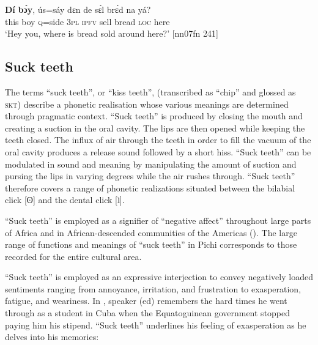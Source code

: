 \ea%
    \label{ex:key:1662}
    \gll \textbf{Dí}  \textbf{bɔ́y}, ús=sáy  dɛn  de  sɛ́l  brɛ́d    na  yá?\\
this  boy  \textsc{q=}side  \textsc{3pl}  \textsc{ipfv}  sell  bread  \textsc{loc}  here\\

\glt ‘Hey you, where is bread sold around here?’ [nn07fn 241]
\z

\subsection{Suck teeth}\label{sec:12.2.4}

The terms “suck teeth”, or “kiss teeth”, (transcribed as “chip” and glossed as \textsc{skt}) describe a phonetic realisation whose various meanings are determined through pragmatic context. “Suck teeth” is produced by closing the mouth and creating a suction in the oral cavity. The lips are then opened while keeping the teeth closed. The influx of air through the teeth in order to fill the vacuum of the oral cavity produces a release sound followed by a short hiss. “Suck teeth” can be modulated in sound and meaning by manipulating the amount of suction and pursing the lips in varying degrees while the air rushes through. “Suck teeth” therefore covers a range of phonetic realizations situated between the bilabial click [ʘ] and the dental click [ʇ].


“Suck teeth” is employed as a signifier of “negative affect” \citep{Figueroa2005} throughout large parts of Africa and in African-descended communities of the Americas (\citealt{RickfordRickford1976}). The large range of functions and meanings of “suck teeth” in Pichi corresponds to those recorded for the entire cultural area.



“Suck teeth” is employed as an expressive interjection to convey negatively loaded sentiments ranging from annoyance, irritation, and frustration to exasperation, fatigue, and weariness. In , speaker (ed) remembers the hard times he went through as a student in Cuba when the Equatoguinean government stopped paying him his stipend. “Suck teeth” underlines his feeling of exasperation as he delves into his memories: 



\ea%
    \label{ex:key:1663}
\z\z

